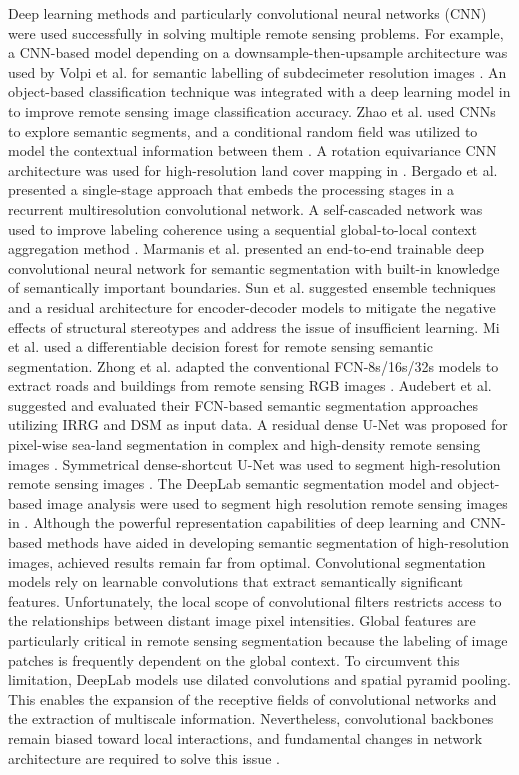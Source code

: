 \documentclass[journal]{IEEEtran}
\begin{document}
Deep learning methods and particularly convolutional neural networks (CNN) were used successfully in solving multiple remote sensing problems. For example, a CNN-based model depending on a downsample-then-upsample architecture was used by Volpi et al. for semantic labelling of subdecimeter resolution images \cite{7725499}. An object-based classification technique was integrated with a deep learning model in \cite{7890382} to improve remote sensing image classification accuracy. Zhao et al. used CNNs to explore semantic segments, and a conditional random field was utilized to model the contextual information between them \cite{ZHAO201748}. A rotation equivariance CNN architecture was used for high-resolution land cover mapping in \cite{MARCOS201896}. Bergado et al. \cite{8388225} presented a single-stage approach that embeds the processing stages in a recurrent multiresolution convolutional network. A self-cascaded network was used to improve labeling coherence using a sequential global-to-local context aggregation method \cite{LIU201878}. Marmanis et al. \cite{MARMANIS2018158} presented an end-to-end trainable deep convolutional neural network for semantic segmentation with built-in knowledge of semantically important boundaries. Sun et al. \cite{SUN2019297} suggested ensemble techniques and a residual architecture for encoder-decoder models to mitigate the negative effects of structural stereotypes and address the issue of insufficient learning. Mi et al. \cite{MI2020140} used a differentiable decision forest for remote sensing semantic segmentation. Zhong et al. adapted the conventional FCN-8s/16s/32s models to extract roads and buildings from remote sensing RGB images \cite{7729406}.  Audebert et al. \cite{AUDEBERT201820} suggested and evaluated their FCN-based semantic segmentation approaches utilizing IRRG and DSM as input data. A residual dense U-Net was proposed for pixel-wise sea-land segmentation in complex and high-density remote sensing images \cite{8789636}. Symmetrical dense-shortcut U-Net was used to segment high-resolution remote sensing images \cite{doi:10.1080/01431161.2020.1742944}. The DeepLab semantic segmentation model and object-based image analysis were used to segment high resolution remote sensing images in \cite{doi:10.1080/17538947.2020.1831087}. Although the powerful representation capabilities of deep learning and CNN-based methods have aided in developing semantic segmentation of high-resolution images, achieved results remain far from optimal. 
Convolutional segmentation models rely on learnable convolutions that extract semantically significant features. Unfortunately, the local scope of convolutional filters restricts access to the relationships between distant image pixel intensities. Global features are particularly critical in remote sensing segmentation because the labeling of image patches is frequently dependent on the global context. To circumvent this limitation, DeepLab models \cite{doi:10.1080/17538947.2020.1831087} use dilated convolutions and spatial pyramid pooling. This enables the expansion of the receptive fields of convolutional networks and the extraction of multiscale information. Nevertheless, convolutional backbones remain biased toward local interactions, and fundamental changes in network architecture are required to solve this issue \cite{Strudel_2021_ICCV}. 
\end{document}
